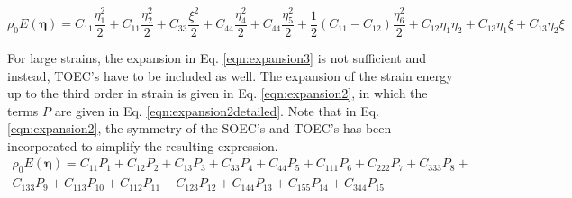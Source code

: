 \documentclass[showpacs,aps,floatfix,prb,reprint,superscriptaddress,onecolumn]{revtex4-1}
\begin{document}

\begin{equation}
\label{eqn:expansion3} 
\rho_{0} E \left(\bm{\eta}\right) = C_{11}\frac{\eta_{1}^2}{2} + C_{11}\frac{\eta_{2}^2}{2} +  C_{33}\frac{\xi^2}{2} + C_{44}\frac{\eta_{4}^2}{2} + C_{44}\frac{\eta_{5}^2}{2} + \frac{1}{2} \left(C_{11}-C_{12}\right)\frac{\eta_{6}^2}{2} + C_{12}\eta_{1}\eta_{2} + C_{13}\eta_{1}\xi + C_{13}\eta_{2}\xi
\end{equation}


For large strains, the expansion in Eq. \ref{eqn:expansion3} is not sufficient and instead, TOEC's have to be included as well. The expansion of the strain energy up to the third order in strain is given in Eq. \ref{eqn:expansion2}, in which the terms $P$ are given in Eq. \ref{eqn:expansion2detailed}. Note that in Eq. \ref{eqn:expansion2}, the symmetry of the SOEC's and TOEC's has been incorporated to simplify the resulting expression. 
\begin{multline}
\label{eqn:expansion2} 
\rho_{0} E \left(\bm{\eta}\right) = C_{11} P_{1} +  C_{12} P_{2} + C_{13} P_{3} + C_{33} P_{4} + C_{44} P_{5} + C_{111} P_{6} + C_{222} P_{7} + C_{333} P_{8} + \\ C_{133} P_{9} +  C_{113} P_{10} + C_{112} P_{11} + C_{123} P_{12} + C_{144} P_{13} + C_{155} P_{14} + C_{344} P_{15}
\end{multline}
\end{document}
